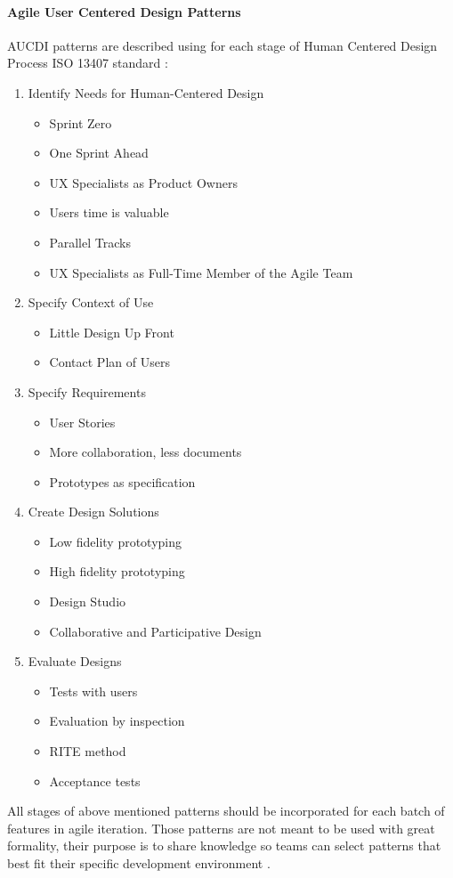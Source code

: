 \documentclass{article}
\begin{document}
\paragraph{Agile User Centered Design Patterns}
AUCDI patterns are described using for each stage of Human Centered Design Process ISO 13407 standard \cite{bertholdo2014agile}\cite{bertholdo2016agile} :
\begin{enumerate}
 \item Identify Needs for Human-Centered Design
 \begin{itemize}
     \item Sprint Zero
     \item One Sprint Ahead
     \item UX Specialists as Product Owners 
     \item Users time is valuable
     \item Parallel Tracks
     \item UX Specialists as Full-Time Member of the Agile Team
 \end{itemize}
 \item Specify Context of Use
 \begin{itemize}
     \item Little Design Up Front
     \item Contact Plan of Users
 \end{itemize}
 \item Specify Requirements
 \begin{itemize}
     \item User Stories
     \item More collaboration, less documents
     \item Prototypes as specification
 \end{itemize}
 \item Create Design Solutions
 \begin{itemize}
     \item Low fidelity prototyping
     \item High fidelity prototyping
     \item Design Studio
     \item Collaborative and Participative Design
 \end{itemize}
 \item Evaluate Designs
 \begin{itemize}
     \item Tests with users
     \item Evaluation by inspection
     \item RITE method
     \item Acceptance tests
 \end{itemize}
\end{enumerate}
All stages of above mentioned patterns should be incorporated for each batch of features in agile iteration. Those patterns are not meant to be used with great formality, their purpose is to share knowledge so teams can select patterns that best fit their specific development environment  \cite{bertholdo2016agile}.
\end{document}
